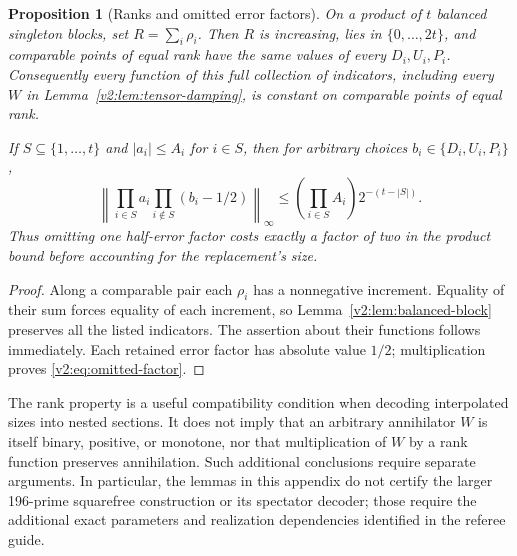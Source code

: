 \documentclass[11pt]{article}
\numberwithin{equation}{section}
\newtheorem{proposition}[theorem]{Proposition}
\theoremstyle{definition}
\theoremstyle{remark}
\begin{document}
\begin{proposition}[Ranks and omitted error factors]
\label{v2:prop:damping-rank}
On a product of $t$ balanced singleton blocks, set
$R=\sum_i\rho_i$.  Then $R$ is increasing, lies in $\{0,\ldots,2t\}$,
and comparable points of equal rank have the same values of every
$D_i,U_i,P_i$.  Consequently every function of this full collection of
indicators, including every $W$ in Lemma~\ref{v2:lem:tensor-damping},
is constant on comparable points of equal rank.

If $S\subseteq\{1,\ldots,t\}$ and $|a_i|\le A_i$ for $i\in S$, then
for arbitrary choices $b_i\in\{D_i,U_i,P_i\}$,
\begin{equation}\label{v2:eq:omitted-factor}
 \left\|\prod_{i\in S}a_i\prod_{i\notin S}(b_i-1/2)\right\|_\infty
 \le \left(\prod_{i\in S}A_i\right)2^{-(t-|S|)}.
\end{equation}
Thus omitting one half-error factor costs exactly a factor of two in the
product bound before accounting for the replacement's size.
\end{proposition}
\begin{proof}
Along a comparable pair each $\rho_i$ has a nonnegative increment.
Equality of their sum forces equality of each increment, so
Lemma~\ref{v2:lem:balanced-block} preserves all the listed indicators.
The assertion about their functions follows immediately.  Each retained
error factor has absolute value $1/2$; multiplication proves
\eqref{v2:eq:omitted-factor}.
\end{proof}

The rank property is a useful compatibility condition when decoding
interpolated sizes into nested sections.  It does not imply that an
arbitrary annihilator $W$ is itself binary, positive, or monotone, nor
that multiplication of $W$ by a rank function preserves annihilation.
Such additional conclusions require separate arguments.  In particular,
the lemmas in this appendix do not certify the larger 196-prime
squarefree construction or its spectator decoder; those require the
additional exact parameters and realization dependencies identified in
the referee guide.

\end{document}
